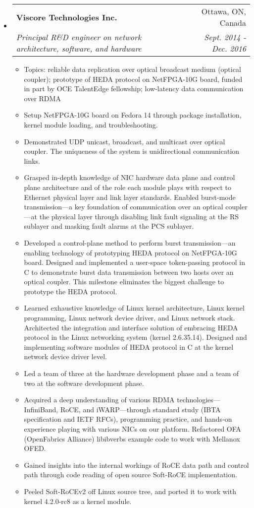 \documentclass[letterpaper,11pt]{article}
\makeatletter
\newcommand{\ressubheading}[4]{
\begin{tabular*}{6.69in}{l@{\extracolsep{\fill}}r}
        \textbf{#1} & #2 \\
        \textit{#3} & \textit{#4} \\
\end{tabular*}\vspace{-6pt}
}
\newcommand{\resitem}[1]{\item #1 \vspace{-2pt}}
\makeatother
\begin{document}
\begin{CJK}{UTF8}{gbsn}
\begin{itemize}
\item
  \ressubheading{Viscore Technologies Inc.}{Ottawa, ON, Canada}
  {Principal R\&D engineer on network architecture, software, and hardware}{Sept. 2014 - Dec. 2016}
  \begin{itemize}
    \resitem{Topics: reliable data replication over optical broadcast medium (optical coupler); prototype of HEDA protocol on NetFPGA-10G board,
    funded in part by OCE TalentEdge fellowship; low-latency data communication over RDMA}
    \resitem{Setup NetFPGA-10G board on Fedora 14 through package installation, kernel module loading, and troubleshooting.}
    \resitem{Demonstrated UDP unicast, broadcast, and multicast over optical coupler. The uniqueness of the system is unidirectional communication links.}
    \resitem{Grasped in-depth knowledge of NIC hardware data plane and control plane architecture and of the role each module plays
    with respect to Ethernet physical layer and link layer standards.
    Enabled burst-mode transmission---a key foundation of communication over an optical coupler---at the physical layer
    through disabling link fault signaling at the RS sublayer and masking fault alarms at the PCS sublayer.}
    \resitem{Developed a control-plane method to perform burst transmission---an enabling technology of prototyping HEDA protocol on NetFPGA-10G board.
    Designed and implemented a user-space token-passing protocol in C to demonstrate burst data transmission between two hosts over an optical coupler.
    This milestone eliminates the biggest challenge to prototype the HEDA protocol.}
    \resitem{Learned exhaustive knowledge of Linux kernel architecture, Linux kernel programming, Linux network device driver, and Linux network stack.
    Architected the integration and interface solution of embracing HEDA protocol in the Linux networking system (kernel 2.6.35.14).
    Designed and implementing software modules of HEDA protocol in C at the kernel network device driver level.}
    \resitem{Led a team of three at the hardware development phase and a team of two at the software development phase.}
    \resitem{Acquired a deep understanding of various RDMA technologies---InfiniBand, RoCE, and iWARP---through
    standard study (IBTA specification and IETF RFCs), programming practice, and hands-on experience playing with various NICs on our platform.
    Refactored OFA (OpenFabrics Alliance) libibverbs example code to work with Mellanox OFED.}
    \resitem{Gained insights into the internal workings of RoCE data path and control path through code reading of open source Soft-RoCE implementation.}
    \resitem{Peeled Soft-RoCEv2 off Linux source tree, and ported it to work with kernel 4.2.0-rc8 as a kernel module.}
  \end{itemize}



\end{itemize}
\end{CJK}
\end{document}
